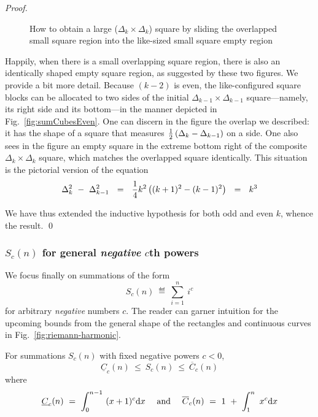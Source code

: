 \begin{proof}
\begin{figure}[hbt]
\begin{center}
\caption{How to obtain a large ($\Delta_k \times \Delta_k$) square by sliding the overlapped small square region into the like-sized small square empty region}
       \label{fig:sumCubesEvenFinal}
\end{center}
\end{figure}
Happily, when there is a small overlapping square region, there is also an identically shaped empty square region, as suggested by these two figures.  We provide a bit more detail.  Because $(k-2)$ is even, the like-configured square blocks can be allocated to two sides of the initial $\Delta_{k-1} \times \Delta_{k-1}$ square---namely, its right side and its bottom---in the manner depicted in Fig.~\ref{fig:sumCubesEven}.  One can discern in the figure the overlap we described: it has the shape of a square that measures  ${1 \over 2} \left( \Delta_k - \Delta_{k-1}\right)$ on a side.  One also sees in the figure an empty square in the extreme bottom right of the composite $\Delta_k \times \Delta_k$ square, which matches the overlapped square identically.  This situation is the pictorial version of the equation
\[ \Delta_k^2 \ - \ \Delta_{k-1}^2 
 \ \ =  \ \ {1 \over 4} k^2 \left( (k+1)^2 - (k-1)^2 \right)  \ \ = \ \ k^3 \]

We have thus extended the inductive hypothesis for both odd and even $k$, whence the
result.  \qed
\end{proof}


\subsubsection{$S_c(n)$ for general {\em negative} $c$th powers}
\label{sec:sum-of-i2c<0}

We focus finally on summations of the form
\[ S_c(n) \ \eqdef \ \sum_{i=1}^n \ i^c \]
for arbitrary {\em negative} numbers $c$.  The reader can garner intuition for the upcoming bounds from the general shape of the rectangles and continuous curves in 
Fig.~\ref{fig:riemann-harmonic}.

\begin{prop}
\label{thm:general-bounds-negative-xc}
For summations $S_c(n)$ with fixed negative powers $c<0$,
\begin{equation} 
\label{eq:general-bounds-negative-xc}
\underline{C}_c(n) \  \leq \ S_c(n) \ \leq \ \overline{C}_c(n)
\end{equation}
where
\[ \underline{C}_c(n) \ = \ \int_0^{n-1} \ (x+1)^c {\rm d}x \ \ \ 
\mbox{ and } \ \ \ 
 \overline{C}_c(n) \ = \ 1 \ + \ \int_1^n \ x^c {\rm d}x \]
\end{prop}

